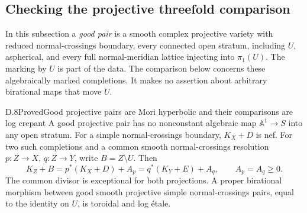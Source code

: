 \subsection{Checking the projective threefold comparison}

In this subsection a \emph{good pair} is a smooth complex projective variety with reduced normal-crossings boundary, every connected open stratum, including $U$, aspherical, and every full normal-meridian lattice injecting into $\pi_1(U)$. The marking by $U$ is part of the data. The comparison below concerns these algebraically marked completions. It makes no assertion about arbitrary birational maps that move $U$.

\begin{result}{D.8}{Proved}{Good projective pairs are Mori hyperbolic and their comparisons are log crepant}
A good projective pair has no nonconstant algebraic map $\mathbb A^1\to S$ into any open stratum. For a simple normal-crossings boundary, $K_X+D$ is nef. For two such completions and a common smooth normal-crossings resolution $p:Z\to X$, $q:Z\to Y$, write $B=Z\setminus U$. Then
\[
 K_Z+B=p^*(K_X+D)+A_p=q^*(K_Y+E)+A_q,
 \qquad A_p=A_q\geq0.
\]
The common divisor is exceptional for both projections. A proper birational morphism between good smooth projective simple normal-crossings pairs, equal to the identity on $U$, is toroidal and log \'etale.
\end{result}
